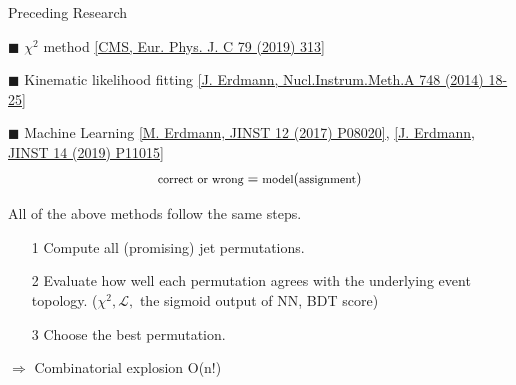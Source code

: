 \documentclass[10pt]{beamer}
\begin{document}
\begin{frame}[fragile]{Preceding Research}
    \begin{block}{$\blacksquare$ $\chi^{2}$ method {\scriptsize \href{https://link.springer.com/article/10.1140\%2Fepjc\%2Fs10052-019-6788-2}{[CMS, Eur. Phys. J. C 79 (2019) 313]}}}
        \centering
        \smallskip
    \end{block}
    
    \begin{block}{$\blacksquare$ Kinematic likelihood fitting {\scriptsize \href{https://www.sciencedirect.com/science/article/pii/S0168900214001855?via\%3Dihub}{[J. Erdmann, Nucl.Instrum.Meth.A 748 (2014) 18-25]}}}
        \centering
        \smallskip
    \end{block}

    \begin{block}{$\blacksquare$ Machine Learning {\tiny \href{https://iopscience.iop.org/article/10.1088/1748-0221/12/08/P08020}{[M. Erdmann, JINST 12 (2017) P08020]}, \href{https://iopscience.iop.org/article/10.1088/1748-0221/14/11/P11015}{[J. Erdmann, JINST 14 (2019) P11015]}}}
        $${\footnotesize \text{correct or wrong} = \text{model}(\text{assignment})}$$
    \end{block}
    
    
    All of the above methods follow the same steps.
    \begin{itemize}
        \item[1] Compute all (promising) jet permutations.
        \item[2] Evaluate how well each permutation agrees with the underlying event topology.  {(\scriptsize $\chi^{2}, \mathcal{L},$ the sigmoid output of NN, BDT score)}
        \item[3] Choose the best permutation.
    \end{itemize}
    
    $\Rightarrow$ Combinatorial explosion O(n!)
\end{frame}
\end{document}
